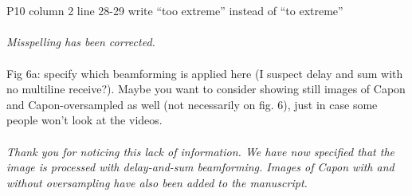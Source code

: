 \documentclass{article}
\begin{document}
\\\\
P10 column 2 line 28-29 write “too extreme” instead of “to extreme”
\\\\
\textit{Misspelling has been corrected.}
\\\\
Fig 6a: specify which beamforming is applied here (I suspect delay and sum with no multiline receive?). Maybe you want to consider showing still images of Capon and Capon-oversampled as well (not necessarily on fig. 6), just in case some people won’t look at the videos.
\\\\
\textit{Thank you for noticing this lack of information. We have now specified that the image is processed with delay-and-sum beamforming. Images of Capon with and without oversampling have also been added to the manuscript.}
\end{document}

